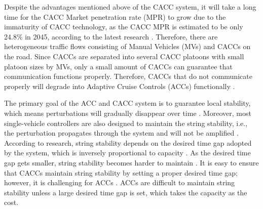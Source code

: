 \documentclass[journal]{IEEEtran}
\begin{document}
Despite the advantages mentioned above of the CACC system, it will take a long time for the CACC Market penetration rate (MPR) to grow due to the immaturity of CACC technology, as the CACC MPR is estimated to be only 24.8\% in 2045, according to the latest research \citep{Bansal2017}. Therefore, there are heterogeneous traffic flows consisting of Manual Vehicles (MVs) and CACCs on the road. Since CACCs are separated into several CACC platoons with small platoon sizes by MVs, only a small amount of CACCs can guarantee that communication functions properly. Therefore, CACCs that do not communicate properly will degrade into Adaptive Cruise Controls (ACCs) functionally \citep{ruanImpactsInformationFlow2022,Yao2021}.

The primary goal of the ACC and CACC system is to guarantee local stability, which means perturbations will gradually disappear over time \citep{qin2018stability,ruan2021stability}. Moreover, most single-vehicle controllers are also designed to maintain the string stability, i.e., the perturbation propagates through the system and will not be amplified \citep{wang2018infrastructure,sun2018stability,ploeg2013lp}. According to research, string stability depends on the desired time gap adopted by the system, which is inversely proportional to capacity \citep{wang2019stability,qin2021lighthill}. As the desired time gap gets smaller, string stability becomes harder to maintain \citep{navas2016using}. It is easy to ensure that CACCs maintain string stability by setting a proper desired time gap; however, it is challenging for ACCs \citep{Montanino2021a,Shang2021,marsden2001towards}. ACCs are difficult to maintain string stability unless a large desired time gap is set, which takes the capacity as the cost.
\end{document}
